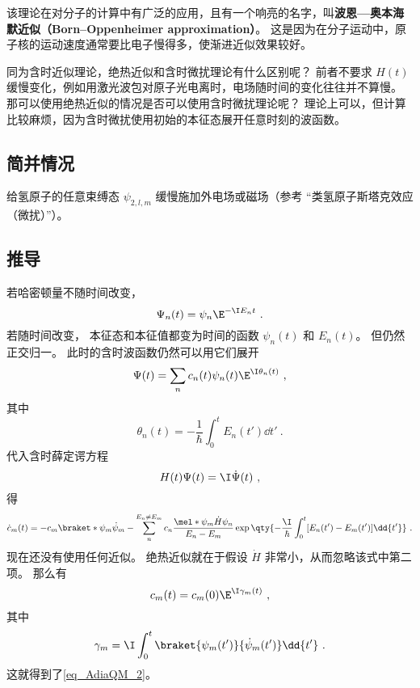 该理论在对分子的计算中有广泛的应用，且有一个响亮的名字，叫\textbf{波恩—奥本海默近似（Born–Oppenheimer approximation）}。 这是因为在分子运动中，原子核的运动速度通常要比电子慢得多，使渐进近似效果较好。

同为含时近似理论，绝热近似和含时微扰理论有什么区别呢？ 前者不要求 $H(t)$ 缓慢变化，例如用激光波包对原子光电离时，电场随时间的变化往往并不算慢。 那可以使用绝热近似的情况是否可以使用含时微扰理论呢？ 理论上可以，但计算比较麻烦，因为含时微扰使用初始的本征态展开任意时刻的波函数。

\subsection{简并情况}

\begin{example}{}
给氢原子的任意束缚态 $\psi_{2,l,m}$ 缓慢施加外电场或磁场（参考 “类氢原子斯塔克效应（微扰）”）。
\end{example}

\subsection{推导}
若哈密顿量不随时间改变，
\begin{equation}
\Psi_n(t) = \psi_n \E^{-\I E_n t}~.
\end{equation}
若随时间改变， 本征态和本征值都变为时间的函数 $\psi_n(t)$ 和 $E_n(t)$。 但仍然正交归一。 此时的含时波函数仍然可以用它们展开
\begin{equation}
\Psi(t) = \sum_n c_n(t) \psi_n(t) \E^{\I \theta_n(t)}~,
\end{equation}
其中
\begin{equation}
\theta_n(t) = -\frac{1}{\hbar} \int_0^t E_n(t')\dd{t'}~.
\end{equation}
代入含时薛定谔方程
\begin{equation}\label{eq_AdiaQM_1}
H(t)\Psi(t) = \I \dot \Psi(t)~,
\end{equation}
得
\begin{equation}
\dot c_m(t) = -c_m \braket*{\psi_m}{\dot\psi_m} - \sum_{n}^{E_n\ne E_m} c_n \frac{\mel*{\psi_m}{\dot H}{\psi_n}}{E_n-E_m} \exp\qty{{-\frac{\I}{\hbar}\int_0^t[E_n(t')-E_m(t')]\dd{t'}}}~.
\end{equation}
现在还没有使用任何近似。 绝热近似就在于假设 $\dot H$ 非常小，从而忽略该式中第二项。 那么有
\begin{equation}
c_m(t) = c_m(0)\E^{\I\gamma_m(t)}~,
\end{equation}
其中
\begin{equation}
\gamma_m = \I \int_0^t \braket{\psi_m(t')}{\dot\psi_m(t')}\dd{t'}~.
\end{equation}
这就得到了\autoref{eq_AdiaQM_2}。
